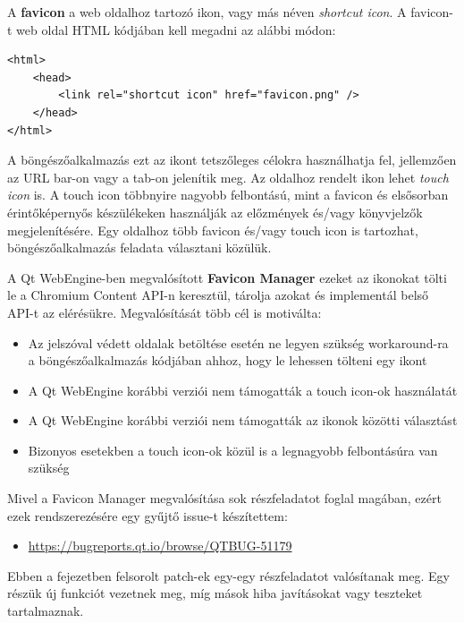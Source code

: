 \documentclass[12pt]{report}
\let\origurl\url
\renewcommand{\url}[1]{%
    \textcolor{blue}{\origurl{#1}}
}
\newcommand{\qtbug}[1]{%
    \textcolor{qtred}{\origurl{https://bugreports.qt.io/browse/QTBUG-#1}}
}
\begin{document}
\noindent
A \textbf{favicon} a web oldalhoz tartozó ikon, vagy más néven \textit{shortcut icon}. A
favicon-t web oldal HTML kódjában kell megadni az alábbi módon:
\begin{verbatim}
<html>
    <head>
        <link rel="shortcut icon" href="favicon.png" />
    </head>
</html>
\end{verbatim}
A böngészőalkalmazás ezt az ikont tetszőleges célokra használhatja fel, jellemzően az URL
bar-on vagy a tab-on jelenítik meg.
Az oldalhoz rendelt ikon lehet \textit{touch icon} is. A touch icon többnyire nagyobb
felbontású, mint a favicon és elsősorban érintőképernyős készülékeken használják az
előzmények és/vagy könyvjelzők megjelenítésére. Egy oldalhoz több favicon és/vagy touch icon
is tartozhat, böngészőalkalmazás feladata választani közülük.

A Qt WebEngine-ben megvalósított \textbf{Favicon Manager} ezeket az ikonokat tölti le a
Chromium Content API-n keresztül, tárolja azokat és implementál belső API-t az elérésükre.
Megvalósítását több cél is motiválta:
\begin{itemize}
    \item Az jelszóval védett oldalak betöltése esetén ne legyen szükség workaround-ra a
        böngészőalkalmazás kódjában ahhoz, hogy le lehessen tölteni egy ikont
    \item A Qt WebEngine korábbi verziói nem támogatták a touch icon-ok használatát
    \item A Qt WebEngine korábbi verziói nem támogatták az ikonok közötti választást
    \item Bizonyos esetekben a touch icon-ok közül is a legnagyobb felbontásúra van szükség
\end{itemize}

Mivel a Favicon Manager megvalósítása sok részfeladatot foglal magában, ezért ezek
rendszerezésére egy gyűjtő issue-t készítettem:
\begin{center}
    \begin{issuebox}
        \begin{itemize}
            \renewcommand{\labelitemi}{\textcolor{qtred}{$\blacktriangleright$}}
            \item \qtbug{51179}
        \end{itemize}
    \end{issuebox}
\end{center}
Ebben a fejezetben felsorolt patch-ek egy-egy részfeladatot valósítanak meg. Egy részük
új funkciót vezetnek meg, míg mások hiba javításokat vagy teszteket tartalmaznak.
\end{document}

